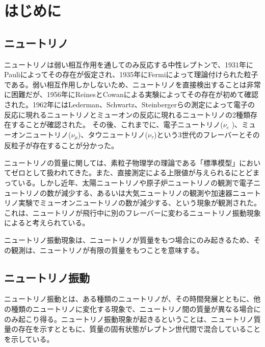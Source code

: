 \documentclass[11pt]{jreport}
\begin{document}
\tableofcontents



\chapter{はじめに}
\pagestyle{bothstyle}
\section{ニュートリノ}

ニュートリノは弱い相互作用を通してのみ反応する中性レプトンで、1931年にPauliによってその存在が仮定され、1935年にFermiによって理論付けられた粒子である。弱い相互作用しかしないため、ニュートリノを直接検出することは非常に困難だが、1956年にReinesとCowanによる実験によってその存在が初めて確認された。1962年にはLederman、Schwartz、Steinbergerらの測定によって電子の反応に現れるニュートリノとミューオンの反応に現れるニュートリノの2種類存在することが確認された。
その後、これまでに、電子ニュートリノ($\nu_{e}$ )、ミューオンニュートリノ($\nu_{\mu}$)、タウニュートリノ($\nu_{\tau}$)という3世代のフレーバーとその反粒子が存在することが分かった。

ニュートリノの質量に関しては、素粒子物理学の理論である「標準模型」においてゼロとして扱われてきた。また、直接測定による上限値が与えられるにとどまっている。しかし近年、太陽ニュートリノや原子炉ニュートリノの観測で電子ニュートリノの数が減少する、あるいは大気ニュートリノの観測や加速器ニュートリノ実験でミューオンニュートリノの数が減少する、という現象が観測された。これは、ニュートリノが飛行中に別のフレーバーに変わるニュートリノ振動現象によると考えられている。

ニュートリノ振動現象は、ニュートリノが質量をもつ場合にのみ起きるため、その観測は、ニュートリノが有限の質量をもつことを意味する。


\section{ニュートリノ振動}
ニュートリノ振動とは、ある種類のニュートリノが、その時間発展とともに、他の種類のニュートリノに変化する現象で、ニュートリノ間の質量が異なる場合にのみ起こり得る。ニュートリノ振動現象が起きるということは、ニュートリノ質量の存在を示すとともに、質量の固有状態がレプトン世代間で混合していることを示している。
\end{document}
